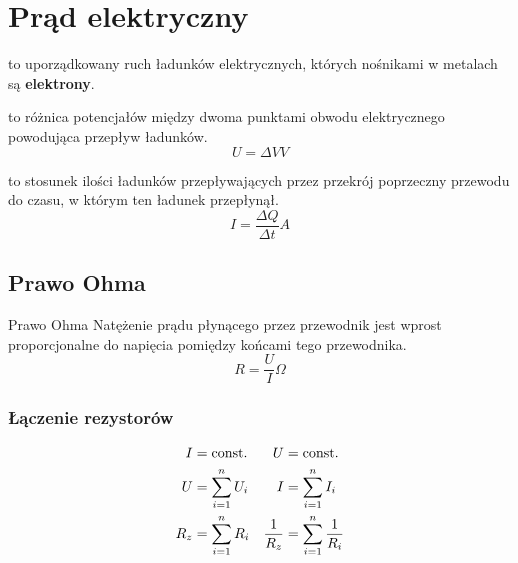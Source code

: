 \chapter{Prąd elektryczny}
  \begin{definition}
     to uporządkowany ruch ładunków elektrycznych, których nośnikami w metalach są \textbf{elektrony}.
  \end{definition}

  \begin{definition}
     to różnica potencjałów między dwoma pun\-ktami obwodu elektrycznego powodująca przepływ ładunków.
    \begin{equation}
      U = \Delta V \unit{V}
    \end{equation}
  \end{definition}

  \begin{definition}
     to stosunek ilości ładunków przepływających przez przekrój poprzeczny przewodu do czasu, w którym ten ładunek przepłynął.
    \begin{equation}
      I = \frac{\Delta Q}{\Delta t} \unit{A}
    \end{equation}
  \end{definition}

  \section{Prawo Ohma}
    \begin{law}{Prawo Ohma}
      Natężenie prądu płynącego przez przewodnik jest wprost proporcjonalne do napięcia pomiędzy końcami tego przewodnika.
      \begin{equation}
        \boxed{R = \frac{U}{I} \unit{\Omega}}
      \end{equation}
    \end{law}

    \subsection{Łączenie rezystorów}
      \begin{align*}
        I &= \operatorname{const.} & U &= \operatorname{const.}\\
        U &= \sum_{i=1}^n U_i & I &= \sum_{i=1}^n I_i\\
        R_z &= \sum_{i=1}^n R_i & \frac{1}{R_z} &= \sum_{i=1}^n \frac{1}{R_i}
      \end{align*}

